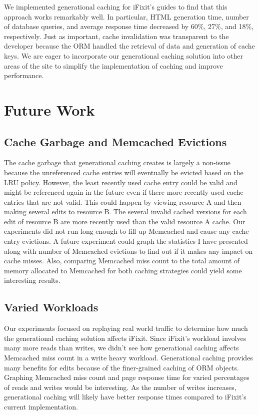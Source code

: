 \documentclass[12pt]{ucthesis}
\begin{document}
We implemented generational caching for \textsf{iFixit}'s guides to find that this approach works remarkably well.
In particular, HTML generation time, number of database queries, and average response time decreased by 60\%, 27\%, and 18\%, respectively.
Just as important, cache invalidation was transparent to the developer because the ORM handled the retrieval of data and generation of cache keys.
We are eager to incorporate our generational caching solution into other areas of the site to simplify the implementation of caching and improve performance.

\section{Future Work}
\subsection{Cache Garbage and Memcached Evictions}
The cache garbage that generational caching creates is largely a non-issue because the unreferenced cache entries will eventually be evicted based on the LRU policy.
However, the least recently used cache entry could be valid and might be referenced again in the future even if there more recently used cache entries that are not valid.
This could happen by viewing resource A and then making several edits to resource B.
The several invalid cached versions for each edit of resource B are more recently used than the valid resource A cache.
Our experiments did not run long enough to fill up \textsf{Memcached} and cause any cache entry evictions.
A future experiment could graph the statistics I have presented along with number of \textsf{Memcached} evictions to find out if it makes any impact on cache misses.
Also, comparing \textsf{Memcached} miss count to the total amount of memory allocated to \textsf{Memcached} for both caching strategies could yield some interesting results.

\subsection{Varied Workloads}
Our experiments focused on replaying real world traffic to determine how much the generational caching solution affects \textsf{iFixit}.
Since \textsf{iFixit}'s workload involves many more reads than writes, we didn't see how generational caching affects \textsf{Memcached} miss count in a write heavy workload.
Generational caching provides many benefits for edits because of the finer-grained caching of ORM objects.
Graphing \textsf{Memcached} miss count and page response time for varied percentages of reads and writes would be interesting.
As the number of writes increases, generational caching will likely have better response times compared to \textsf{iFixit}'s current implementation.



\clearpage


\end{document}
